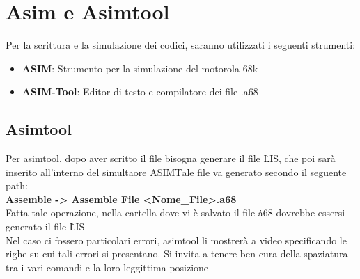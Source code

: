 \section{Asim e Asimtool}
Per la scrittura e la simulazione dei codici, saranno utilizzati i seguenti strumenti:
\begin{itemize}
    \item \textbf{ASIM}: Strumento per la simulazione del motorola 68k
    \item \textbf{ASIM-Tool}: Editor di testo e compilatore dei file .a68
\end{itemize}

\subsection{Asimtool}

Per asimtool, dopo aver scritto il file bisogna generare il file \.LIS, che poi sarà inserito all'interno del simultaore ASIM\. Tale file va generato secondo il seguente path: 
\\
\textbf{Assemble -> Assemble File <Nome\_File>.a68}
\\
Fatta tale operazione, nella cartella dove vi è salvato il file \.a68 dovrebbe essersi generato il file \.LIS
\\
Nel caso ci fossero particolari errori, asimtool li mostrerà a video specificando le righe su cui tali errori si presentano. Si invita a tenere ben cura della spaziatura tra i vari comandi e la loro leggittima posizione


